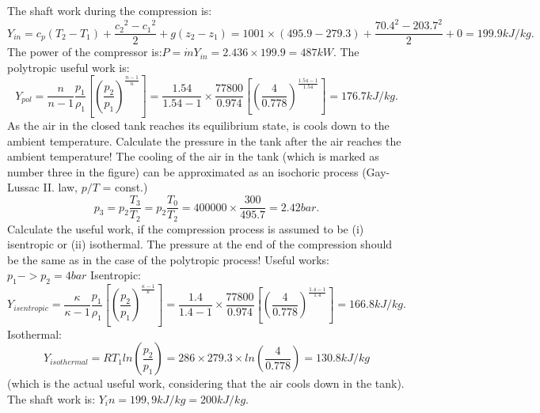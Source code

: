\begin{tcolorbox}[breakable]
The shaft work during the compression is:
\begin{equation*}
	Y_{in}=c_p(T_2-T_1)+\frac{{c_2}^2-{c_1}^2}{2}+g(z_2-z_1)=1001 \times (495.9-279.3)+\frac{{70.4}^2-{203.7}^2}{2}+0=199.9 kJ/kg.
\end{equation*}
The power of the compressor is:$P={\dot m}Y_{in}=2.436 \times 199.9=487 kW$.
The polytropic useful work is:
\begin{equation*}
	Y_{pol}=\frac{n}{n-1}\frac{p_1}{\rho_1}\left[\left(\frac{p_2}{p_1}\right)^{\frac{n-1}{n}}\right]=\frac{1.54}{1.54-1}\times\frac{77800}{0.974}\left[\left(\frac{4}{0.778}\right)^{\frac{1.54-1}{1.54}}\right]=176.7 kJ/kg.
\end{equation*}
As the air in the closed tank reaches its equilibrium state, is cools down to the ambient
temperature. Calculate the pressure in the tank after the air reaches the ambient temperature!
The cooling of the air in the tank (which is marked as number three in the figure) can be
approximated as an isochoric process (Gay-Lussac II. law, $p/T$ = const.)
\begin{equation*}
	p_3=p_2\frac{T_3}{T_2}=p_2\frac{T_0}{T_2}=400000 \times \frac{300}{495.7}=2.42 bar.
\end{equation*}
Calculate the useful work, if the compression process is assumed to be (i) isentropic or (ii)
isothermal. The pressure at the end of the compression should be the same as in the case of
the polytropic process!
Useful works: $p_1 -> p_2=4 bar$
Isentropic:
\begin{equation*}
	Y_{isentropic}=\frac{\kappa}{\kappa-1}\frac{p_1}{\rho_1}\left[\left(\frac{p_2}{p_1}\right)^{\frac{\kappa-1}{\kappa}}\right]=\frac{1.4}{1.4-1}\times\frac{77800}{0.974}\left[\left(\frac{4}{0.778}\right)^{\frac{1.4-1}{1.4}}\right]=166.8 kJ/kg.
\end{equation*}
Isothermal:
\begin{equation*}
	Y_{isothermal}=RT_1ln\left(\frac{p_2}{p_1}\right)=286 \times 279.3 \times ln\left(\frac{4}{0.778}\right)=130.8 kJ/kg
\end{equation*}
(which is the actual useful work, considering that the air cools down in the tank).
The shaft work is: $Y_in = 199,9 kJ/kg = 200 kJ/kg$. 
\end{tcolorbox}

